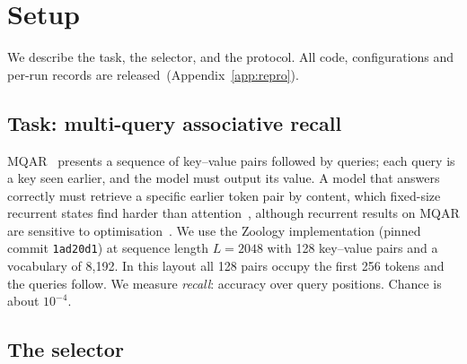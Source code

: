 \section{Setup}
\label{sec:setup}

We describe the task, the selector, and the protocol. All code, configurations and per-run records are
released~(Appendix~\ref{app:repro}).

\subsection{Task: multi-query associative recall}

MQAR~\cite{arora2024zoology} presents a sequence of key--value pairs followed by queries; each query is a key seen
earlier, and the model must output its value. A model that answers correctly must retrieve a specific earlier token
pair by content, which fixed-size recurrent states find harder than attention~\cite{arora2024zoology,
jelassi2024repeat}, although recurrent results on MQAR are sensitive to optimisation~\cite{okpekpe2025revisiting}. We use the Zoology implementation (pinned commit \texttt{1ad20d1}) at sequence length
$L{=}2048$ with 128 key--value pairs and a vocabulary of 8{,}192. In this layout all 128 pairs occupy the first 256
tokens and the queries follow. We measure \emph{recall}: accuracy over query positions. Chance is about
$10^{-4}$.

\subsection{The selector}

